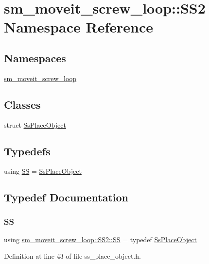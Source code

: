 \hypertarget{namespacesm__moveit__screw__loop_1_1SS2}{}\section{sm\+\_\+moveit\+\_\+screw\+\_\+loop\+:\+:S\+S2 Namespace Reference}
\label{namespacesm__moveit__screw__loop_1_1SS2}
\subsection*{Namespaces}
\begin{DoxyCompactItemize}
\item 
 \hyperlink{namespacesm__moveit__screw__loop_1_1SS2_1_1sm__moveit__screw__loop}{sm\+\_\+moveit\+\_\+screw\+\_\+loop}
\end{DoxyCompactItemize}
\subsection*{Classes}
\begin{DoxyCompactItemize}
\item 
struct \hyperlink{structsm__moveit__screw__loop_1_1SS2_1_1SsPlaceObject}{Ss\+Place\+Object}
\end{DoxyCompactItemize}
\subsection*{Typedefs}
\begin{DoxyCompactItemize}
\item 
using \hyperlink{namespacesm__moveit__screw__loop_1_1SS2_a2f0b3b33ef522c12d9606e6b11a952f7}{SS} = \hyperlink{structsm__moveit__screw__loop_1_1SS2_1_1SsPlaceObject}{Ss\+Place\+Object}
\end{DoxyCompactItemize}


\subsection{Typedef Documentation}
\mbox{\label{namespacesm__moveit__screw__loop_1_1SS2_a2f0b3b33ef522c12d9606e6b11a952f7}} 
\subsubsection{\texorpdfstring{SS}{SS}}
{\footnotesize\ttfamily using \hyperlink{namespacesm__moveit__screw__loop_1_1SS2_a2f0b3b33ef522c12d9606e6b11a952f7}{sm\+\_\+moveit\+\_\+screw\+\_\+loop\+::\+S\+S2\+::\+SS} = typedef \hyperlink{structsm__moveit__screw__loop_1_1SS2_1_1SsPlaceObject}{Ss\+Place\+Object}}



Definition at line 43 of file ss\+\_\+place\+\_\+object.\+h.

